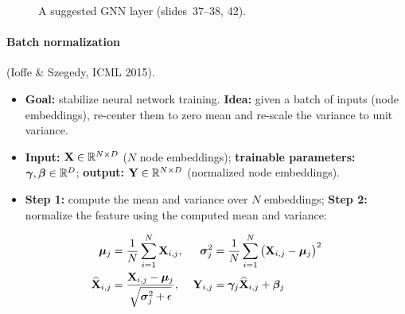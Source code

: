 \begin{figure}[htbp]
  \centering
  \caption{A suggested GNN layer (slides~37--38, 42).}
  \label{fig:lec04-suggested}
\end{figure}

\paragraph{Batch normalization} (Ioffe \& Szegedy, ICML 2015).
\begin{itemize}
  \item \textbf{Goal:} stabilize neural network training. \textbf{Idea:} given a
    batch of inputs (node embeddings), re-center them to zero mean and re-scale
    the variance to unit variance.
  \item \textbf{Input:} $\mathbf{X}\in\mathbb{R}^{N\times D}$ ($N$ node embeddings);
    \textbf{trainable parameters:} $\bm{\gamma},\bm{\beta}\in\mathbb{R}^{D}$;
    \textbf{output:} $\mathbf{Y}\in\mathbb{R}^{N\times D}$ (normalized node embeddings).
  \item \textbf{Step 1:} compute the mean and variance over $N$ embeddings;
    \textbf{Step 2:} normalize the feature using the computed mean and variance:
\end{itemize}
\begin{align}
  \bm{\mu}_j &= \frac{1}{N}\sum_{i=1}^{N}\mathbf{X}_{i,j}, &
  \bm{\sigma}_j^2 &= \frac{1}{N}\sum_{i=1}^{N}\big(\mathbf{X}_{i,j}-\bm{\mu}_j\big)^2
    \label{eq:lec04-bn1}\\
  \widehat{\mathbf{X}}_{i,j} &= \frac{\mathbf{X}_{i,j}-\bm{\mu}_j}{\sqrt{\bm{\sigma}_j^2+\epsilon}}, &
  \mathbf{Y}_{i,j} &= \bm{\gamma}_j\widehat{\mathbf{X}}_{i,j} + \bm{\beta}_j
    \label{eq:lec04-bn2}
\end{align}

